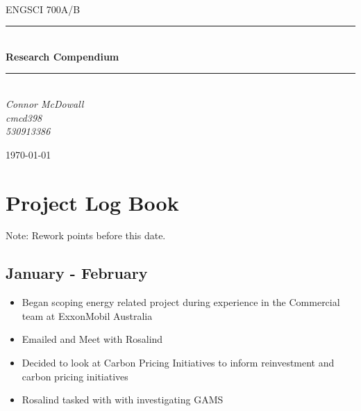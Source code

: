 \documentclass[12pt]{article}
\begin{document}
\begin{titlepage}
	\newcommand{\HRule}{\rule{\linewidth}{0.5mm}} %
	
	\center
	
	
	\textsc{\LARGE }\\[1.5cm] %
	
	\textsc{\Large ENGSCI 700A/B}\\[0.5cm] %
	
	
	\HRule\\[0.5cm]
	
	{\huge\bfseries Research Compendium}\\[0.4cm] %
	
	\HRule\\[0.5cm]
	
	
	{\large\textit{Connor McDowall \\cmcd398 \\530913386}}\\
	
	
	\vfill\vfill\vfill %
	
	{\large\today} %
	 
	
	\vfill %
	
\end{titlepage}
\tableofcontents
\listoffigures
\listoftables
\newpage
\section{Project Log Book}
Note: Rework points before this date.
\subsection{January - February}
\begin{itemize}
	\item Began scoping energy related project during experience in the Commercial team at ExxonMobil Australia
	\item Emailed and Meet with Rosalind
	\item Decided to look at Carbon Pricing Initiatives to inform reinvestment and carbon pricing initiatives
	\item Rosalind tasked with with investigating GAMS
\end{itemize}
\end{document}
